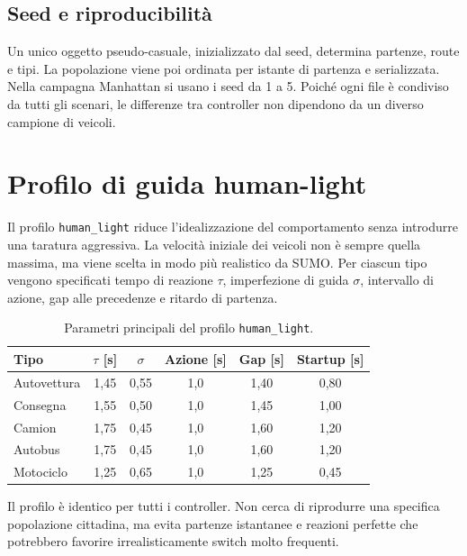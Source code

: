 \documentclass[12pt,a4paper,oneside]{report}
\numberwithin{equation}{chapter}
\begin{document}
\subsection{Seed e riproducibilità}

Un unico oggetto pseudo-casuale, inizializzato dal seed, determina partenze,
route e tipi. La popolazione viene poi ordinata per istante di partenza e
serializzata. Nella campagna Manhattan si usano i seed da 1 a 5. Poiché ogni
file è condiviso da tutti gli scenari, le differenze tra controller non
dipendono da un diverso campione di veicoli.

\section{Profilo di guida human-light}

Il profilo \texttt{human\_light} riduce l'idealizzazione del comportamento
senza introdurre una taratura aggressiva. La velocità iniziale dei veicoli non
è sempre quella massima, ma viene scelta in modo più realistico da SUMO. Per
ciascun tipo vengono specificati tempo di reazione $\tau$, imperfezione di
guida $\sigma$, intervallo di azione, gap alle precedenze e ritardo di
partenza.

\begin{table}[htbp]
    \centering
    \caption{Parametri principali del profilo \texttt{human\_light}.}
    \label{tab:human-light}
    \begin{tabular}{lccccc}
        \toprule
        Tipo & $\tau$ [s] & $\sigma$ & Azione [s] & Gap [s] & Startup [s] \\
        \midrule
        Autovettura & 1,45 & 0,55 & 1,0 & 1,40 & 0,80 \\
        Consegna    & 1,55 & 0,50 & 1,0 & 1,45 & 1,00 \\
        Camion      & 1,75 & 0,45 & 1,0 & 1,60 & 1,20 \\
        Autobus     & 1,75 & 0,45 & 1,0 & 1,60 & 1,20 \\
        Motociclo   & 1,25 & 0,65 & 1,0 & 1,25 & 0,45 \\
        \bottomrule
    \end{tabular}
\end{table}

Il profilo è identico per tutti i controller. Non cerca di riprodurre una
specifica popolazione cittadina, ma evita partenze istantanee e reazioni
perfette che potrebbero favorire irrealisticamente switch molto frequenti.
\end{document}
